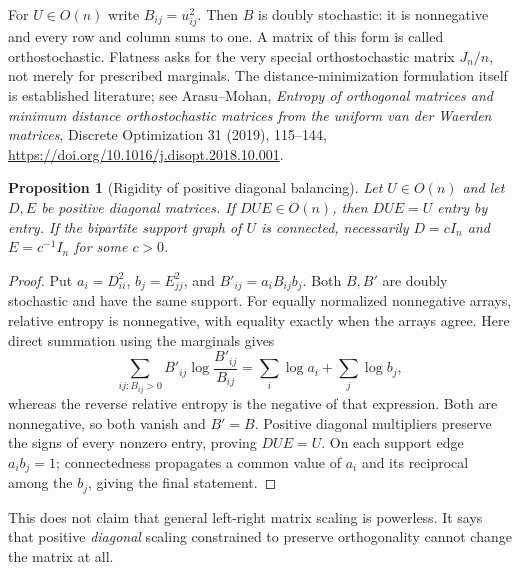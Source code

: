 \documentclass[11pt]{article}
\newtheorem{proposition}[theorem]{Proposition}
\begin{document}
For $U\in O(n)$ write $B_{ij}=u_{ij}^2$. Then $B$ is doubly stochastic:
it is nonnegative and every row and column sums to one. A matrix of
this form is called orthostochastic. Flatness asks for the very special
orthostochastic matrix $J_n/n$, not merely for prescribed marginals.
The distance-minimization formulation itself is established literature;
see Arasu--Mohan, \emph{Entropy of orthogonal matrices and minimum
distance orthostochastic matrices from the uniform van der Waerden
matrices}, Discrete Optimization 31 (2019), 115--144,
\url{https://doi.org/10.1016/j.disopt.2018.10.001}.

\begin{proposition}[Rigidity of positive diagonal balancing]
Let $U\in O(n)$ and let $D,E$ be positive diagonal matrices.
If $DUE\in O(n)$, then $DUE=U$ entry by entry.
If the bipartite support graph of $U$ is connected, necessarily
$D=cI_n$ and $E=c^{-1}I_n$ for some $c>0$.
\end{proposition}
\begin{proof}
Put $a_i=D_{ii}^2$, $b_j=E_{jj}^2$, and
$B'_{ij}=a_iB_{ij}b_j$. Both $B,B'$ are doubly stochastic and have
the same support. For equally normalized nonnegative arrays, relative
entropy is nonnegative, with equality exactly when the arrays agree.
Here direct summation using the marginals gives
\[
 \sum_{ij:B_{ij}>0}B'_{ij}\log\frac{B'_{ij}}{B_{ij}}
 =\sum_i\log a_i+\sum_j\log b_j,
\]
whereas the reverse relative entropy is the negative of that expression.
Both are nonnegative, so both vanish and $B'=B$.
Positive diagonal multipliers preserve the signs of every nonzero
entry, proving $DUE=U$. On each support edge $a_ib_j=1$;
connectedness propagates a common value of $a_i$ and its reciprocal
among the $b_j$, giving the final statement.
\end{proof}

This does not claim that general left-right matrix scaling is powerless.
It says that positive \emph{diagonal} scaling constrained to preserve
orthogonality cannot change the matrix at all.
\end{document}
